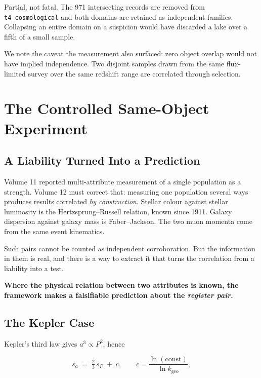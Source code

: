 \documentclass[11pt, letterpaper, openany]{book}
\newcommand{\kgeo}{k_{\mathrm{geo}}}
\begin{document}
Partial, not fatal. The 971 intersecting records are removed from \texttt{t4\_cosmological} and
both domains are retained as independent families. Collapsing an entire domain on a suspicion
would have discarded a lake over a fifth of a small sample.

We note the caveat the measurement also surfaced: zero object overlap would not have implied
independence. Two disjoint samples drawn from the same flux-limited survey over the same
redshift range are correlated through selection.

\chapter{The Controlled Same-Object Experiment}

\section{A Liability Turned Into a Prediction}

Volume 11 reported multi-attribute measurement of a single population as a strength. Volume 12
must correct that: measuring one population several ways produces results correlated
\emph{by construction}. Stellar colour against stellar luminosity is the Hertzsprung--Russell
relation, known since 1911. Galaxy dispersion against galaxy mass is Faber--Jackson. The two
muon momenta come from the same event kinematics.

Such pairs cannot be counted as independent corroboration. But the information in them is real,
and there is a way to extract it that turns the correlation from a liability into a test.

\begin{signalbox}
\textbf{Where the physical relation between two attributes is known, the framework makes a
falsifiable prediction about the \emph{register pair}.}
\end{signalbox}

\section{The Kepler Case}

Kepler's third law gives $a^3 \propto P^2$, hence

\begin{equation}
s_a \;=\; \tfrac{2}{3}\, s_P \;+\; c, \qquad c = \frac{\ln(\text{const})}{\ln \kgeo},
\end{equation}
\end{document}
